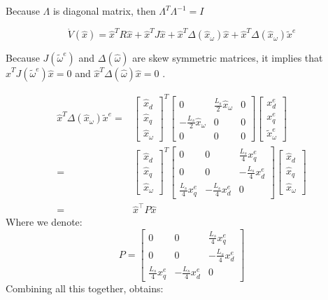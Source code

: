 \documentclass[letterpaper, 10 pt, conference]{ieeeconf}  %
\begin{document}
Because $\Lambda$ is diagonal matrix, then $\Lambda^{T}\Lambda^{-1}=I$

$$
\dot{V}(\hat{x})=\hat{x}^{T}R\hat{x}+\hat{x}^{T}J\hat{x}+\hat{x}^{T}\Delta(\hat{x}_{\omega})\hat{x}+\hat{x}^{T}\Delta(\hat{x}_{\omega})\tilde{x}^{e}
$$

Because $J(\tilde{\omega}^{e})$ and $\Delta(\hat{\omega})$ are skew
symmetric matrices, it implies that $\hat{x}^{T}J(\tilde{\omega}^{e})\hat{x}=0$
and $\hat{x}^{T}\Delta(\hat{\omega})\hat{x}=0$ .

$$
\begin{aligned}
\hat{x}^{T}\Delta(\hat{x}_{\omega})\tilde{x}^{e}  = &\left[\begin{array}{c}
\hat{x}_{d}\\
\hat{x}_{q}\\
\hat{x}_{\omega}
\end{array}\right]^{T}\left[\begin{array}{ccc}
0 & \frac{L_{s}}{2}\hat{x}_{\omega} & 0\\
-\frac{L_{s}}{2}\hat{x}_{\omega} & 0 & 0\\
0 & 0 & 0
\end{array}\right]\left[\begin{array}{c}
x_{d}^{e}\\
x_{q}^{e}\\
\tilde{x}_{\omega}^{e}
\end{array}\right]\\
  =&  \left[\begin{array}{c}
\hat{x}_{d}\\
\hat{x}_{q}\\
\hat{x}_{\omega}
\end{array}\right]^{T}\left[\begin{array}{ccc}
0 & 0 & \frac{L_{s}}{4}x_{q}^{e}\\
0 & 0 & -\frac{L_{s}}{4}x_{d}^{e}\\
\frac{L_{s}}{4}x_{q}^{e} & -\frac{L_{s}}{4}x_{d}^{e} & 0
\end{array}\right]\left[\begin{array}{c}
\hat{x}_{d}\\
\hat{x}_{q}\\
\hat{x}_{\omega}
\end{array}\right]
\\= & \hat{x}^{\top}P\hat{x}
\end{aligned}
$$
Where we denote:
$$
P=\left[\begin{array}{ccc}
0 & 0 & \frac{L_{s}}{4}x_{q}^{e}\\
0 & 0 & -\frac{L_{s}}{4}x_{d}^{e}\\
\frac{L_{s}}{4}x_{q}^{e} & -\frac{L_{s}}{4}x_{d}^{e} & 0
\end{array}\right]
$$
Combining all this together, obtains: 
\end{document}
